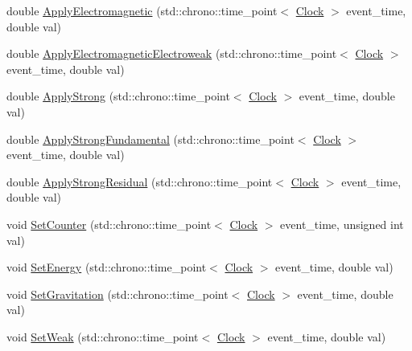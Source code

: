 \begin{DoxyCompactItemize}
double \mbox{\hyperlink{classElementaryForce_a0045a3380e468c6cfdbefce829888c1f}{Apply\+Electromagnetic}} (std\+::chrono\+::time\+\_\+point$<$ \mbox{\hyperlink{universe_8h_a0ef8d951d1ca5ab3cfaf7ab4c7a6fd80}{Clock}} $>$ event\+\_\+time, double val)
\item 
double \mbox{\hyperlink{classElementaryForce_a3764a27b11760b6ead2c8a23ff25d77a}{Apply\+Electromagnetic\+Electroweak}} (std\+::chrono\+::time\+\_\+point$<$ \mbox{\hyperlink{universe_8h_a0ef8d951d1ca5ab3cfaf7ab4c7a6fd80}{Clock}} $>$ event\+\_\+time, double val)
\item 
double \mbox{\hyperlink{classElementaryForce_a8a16bff6b5df2b0ff918262bf6376ade}{Apply\+Strong}} (std\+::chrono\+::time\+\_\+point$<$ \mbox{\hyperlink{universe_8h_a0ef8d951d1ca5ab3cfaf7ab4c7a6fd80}{Clock}} $>$ event\+\_\+time, double val)
\item 
double \mbox{\hyperlink{classElementaryForce_a80f1977e777aa0c8cce2124b666e6446}{Apply\+Strong\+Fundamental}} (std\+::chrono\+::time\+\_\+point$<$ \mbox{\hyperlink{universe_8h_a0ef8d951d1ca5ab3cfaf7ab4c7a6fd80}{Clock}} $>$ event\+\_\+time, double val)
\item 
double \mbox{\hyperlink{classElementaryForce_a185dc4e0b840505df27dbbed9fdcdc7b}{Apply\+Strong\+Residual}} (std\+::chrono\+::time\+\_\+point$<$ \mbox{\hyperlink{universe_8h_a0ef8d951d1ca5ab3cfaf7ab4c7a6fd80}{Clock}} $>$ event\+\_\+time, double val)
\item 
void \mbox{\hyperlink{classElementaryForce_a3762cf66ed266b310446417215dec3fa}{Set\+Counter}} (std\+::chrono\+::time\+\_\+point$<$ \mbox{\hyperlink{universe_8h_a0ef8d951d1ca5ab3cfaf7ab4c7a6fd80}{Clock}} $>$ event\+\_\+time, unsigned int val)
\item 
void \mbox{\hyperlink{classElementaryForce_a466c84ee4a50a29ef1f0fc6509ae3161}{Set\+Energy}} (std\+::chrono\+::time\+\_\+point$<$ \mbox{\hyperlink{universe_8h_a0ef8d951d1ca5ab3cfaf7ab4c7a6fd80}{Clock}} $>$ event\+\_\+time, double val)
\item 
void \mbox{\hyperlink{classElementaryForce_aa36d5875964f7e2fc981f6fc5431be7f}{Set\+Gravitation}} (std\+::chrono\+::time\+\_\+point$<$ \mbox{\hyperlink{universe_8h_a0ef8d951d1ca5ab3cfaf7ab4c7a6fd80}{Clock}} $>$ event\+\_\+time, double val)
\item 
void \mbox{\hyperlink{classElementaryForce_a093cdf0810e95f1d973bd9dc88c6788b}{Set\+Weak}} (std\+::chrono\+::time\+\_\+point$<$ \mbox{\hyperlink{universe_8h_a0ef8d951d1ca5ab3cfaf7ab4c7a6fd80}{Clock}} $>$ event\+\_\+time, double val)
\item 

\end{DoxyCompactItemize}
